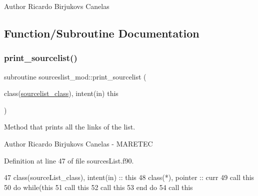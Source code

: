 \begin{DoxyAuthor}{Author}
Ricardo Birjukovs Canelas 
\end{DoxyAuthor}


\subsection{Function/\+Subroutine Documentation}
\mbox{\label{namespacesourceslist__mod_a1c359b48ae24045622cb6ec36a1bf6b2}} 
\subsubsection{\texorpdfstring{print\+\_\+sourcelist()}{print\_sourcelist()}}
{\footnotesize\ttfamily subroutine sourceslist\+\_\+mod\+::print\+\_\+sourcelist (\begin{DoxyParamCaption}\item[{class(\mbox{\hyperlink{structsourceslist__mod_1_1sourcelist__class}{sourcelist\+\_\+class}}), intent(in)}]{this }\end{DoxyParamCaption})\hspace{0.3cm}{\ttfamily [private]}}



Method that prints all the links of the list. 

\begin{DoxyAuthor}{Author}
Ricardo Birjukovs Canelas -\/ M\+A\+R\+E\+T\+EC 
\end{DoxyAuthor}


Definition at line 47 of file sources\+List.\+f90.


\begin{DoxyCode}
47     \textcolor{keywordtype}{class}(sourceList\_class), \textcolor{keywordtype}{intent(in)} :: this
48     \textcolor{keywordtype}{class}(*), \textcolor{keywordtype}{pointer} :: curr
49     \textcolor{keyword}{call }this%
50     \textcolor{keywordflow}{do} \textcolor{keywordflow}{while}(this%
51         \textcolor{keyword}{call }this%
52         \textcolor{keyword}{call }this%
53 \textcolor{keywordflow}{    end do}
54     \textcolor{keyword}{call }this%
\end{DoxyCode}
\mbox{\label{namespacesourceslist__mod_a0d0f94845a8cd355e99e2e82d9ca3d35}} 
